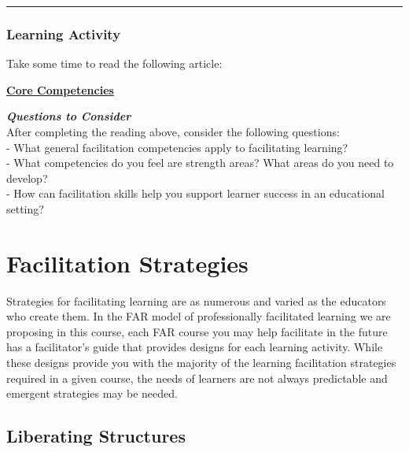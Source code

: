 \documentclass[
]{book}
\begin{document}
\begin{center}\rule{0.5\linewidth}{0.5pt}\end{center}

\begin{reflect}
\hypertarget{learning-activity-7}{%
\subsubsection*{Learning Activity}\label{learning-activity-7}}

Take some time to read the following article:

\href{https://www.iaf-world.org/site/professional/core-competencies}{\textbf{Core Competencies}}

\textbf{\emph{Questions to Consider}}\\
After completing the reading above, consider the following questions:\\
- What general facilitation competencies apply to facilitating learning?\\
- What competencies do you feel are strength areas? What areas do you need to develop?\\
- How can facilitation skills help you support learner success in an educational setting?
\end{reflect}

\hypertarget{facilitation-strategies}{%
\section{Facilitation Strategies}\label{facilitation-strategies}}

Strategies for facilitating learning are as numerous and varied as the educators who create them. In the FAR model of professionally facilitated learning we are proposing in this course, each FAR course you may help facilitate in the future has a facilitator's guide that provides designs for each learning activity. While these designs provide you with the majority of the learning facilitation strategies required in a given course, the needs of learners are not always predictable and emergent strategies may be needed.

\hypertarget{liberating-structures}{%
\subsection*{Liberating Structures}\label{liberating-structures}}
\end{document}
